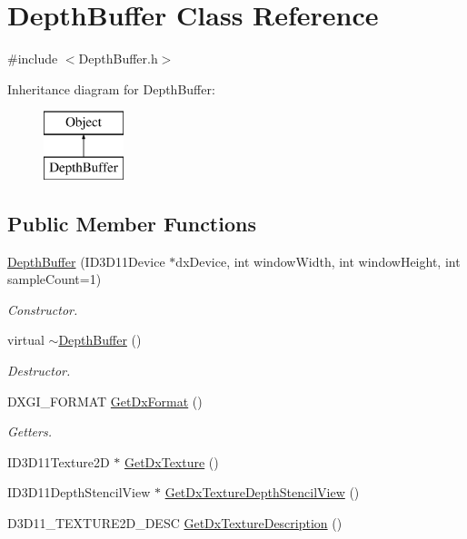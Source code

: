 \hypertarget{class_depth_buffer}{}\section{Depth\+Buffer Class Reference}
\label{class_depth_buffer}


{\ttfamily \#include $<$Depth\+Buffer.\+h$>$}

Inheritance diagram for Depth\+Buffer\+:\begin{figure}[H]
\begin{center}
\leavevmode
\includegraphics[height=2.000000cm]{class_depth_buffer}
\end{center}
\end{figure}
\subsection*{Public Member Functions}
\begin{DoxyCompactItemize}
\item 
\hyperlink{class_depth_buffer_aa5c885f142495745de6e4d4595987dc4}{Depth\+Buffer} (I\+D3\+D11\+Device $\ast$dx\+Device, int window\+Width, int window\+Height, int sample\+Count=1)
\begin{DoxyCompactList}\small\item\em Constructor. \end{DoxyCompactList}\item 
virtual \hyperlink{class_depth_buffer_a9d04ef2a88a2414d476f4fc27a25a7a8}{$\sim$\+Depth\+Buffer} ()
\begin{DoxyCompactList}\small\item\em Destructor. \end{DoxyCompactList}\item 
D\+X\+G\+I\+\_\+\+F\+O\+R\+M\+AT \hyperlink{class_depth_buffer_aa72fe3a246f368d405ff2666c4e150fa}{Get\+Dx\+Format} ()
\begin{DoxyCompactList}\small\item\em Getters. \end{DoxyCompactList}\item 
I\+D3\+D11\+Texture2D $\ast$ \hyperlink{class_depth_buffer_ad3b4f85ced7bb00beea9ac63b0b34774}{Get\+Dx\+Texture} ()
\item 
I\+D3\+D11\+Depth\+Stencil\+View $\ast$ \hyperlink{class_depth_buffer_ad5ff6602f8b18faf2010297e677815ec}{Get\+Dx\+Texture\+Depth\+Stencil\+View} ()
\item 
D3\+D11\+\_\+\+T\+E\+X\+T\+U\+R\+E2\+D\+\_\+\+D\+E\+SC \hyperlink{class_depth_buffer_aedd68b34c8aedb0f8826a89a0b3f19a8}{Get\+Dx\+Texture\+Description} ()
\end{DoxyCompactItemize}
